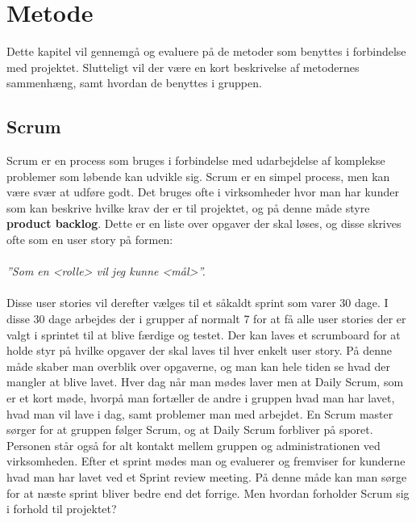 \chapter{Metode}\label{chapter:Metode}

Dette kapitel vil gennemgå og evaluere på de metoder som benyttes i forbindelse med projektet.
Slutteligt vil der være en kort beskrivelse af metodernes sammenhæng, samt hvordan de benyttes i gruppen.

\section{Scrum}

Scrum er en process som bruges i forbindelse med udarbejdelse af komplekse problemer som løbende kan udvikle sig. 
Scrum er en simpel process, men kan være svær at udføre godt.
Det bruges ofte i virksomheder hvor man har kunder som kan beskrive hvilke krav der er til projektet, og på denne måde styre \textbf{product backlog}.
Dette er en liste over opgaver der skal løses, og disse skrives ofte som en user story på formen:\\ \\ \textit{''Som en <rolle> vil jeg kunne <mål>''. }\\ \\
Disse user stories vil derefter vælges til et såkaldt sprint som varer 30 dage. 
I disse 30 dage arbejdes der i grupper af normalt 7 for at få alle user stories der er valgt i sprintet til at blive færdige og testet.
Der kan laves et scrumboard for at holde styr på hvilke opgaver der skal laves til hver enkelt user story. 
På denne måde skaber man overblik over opgaverne, og man kan hele tiden se hvad der mangler at blive lavet.
Hver dag når man mødes laver men at Daily Scrum, som er et kort møde, hvorpå man fortæller de andre i gruppen hvad man har lavet, hvad man vil lave i dag, samt problemer man med arbejdet.
En Scrum master sørger for at gruppen følger Scrum, og at Daily Scrum forbliver på sporet. 
Personen står også for alt kontakt mellem gruppen og administrationen ved virksomheden.
Efter et sprint mødes man og evaluerer og fremviser for kunderne hvad man har lavet ved et Sprint review meeting.
På denne måde kan man sørge for at næste sprint bliver bedre end det forrige. 
Men hvordan forholder Scrum sig i forhold til projektet?

